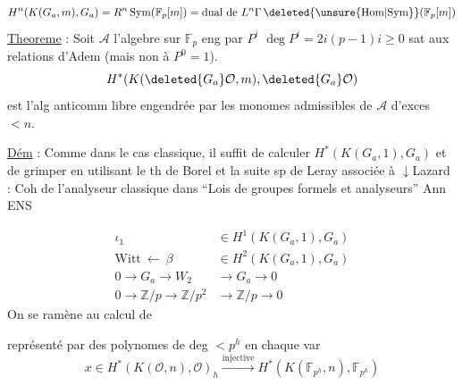 \[
H^n(K(G_a,m),G_a)=R^n\operatorname{Sym}(\mathbb F_p[m])
=\text{dual de }L^n\Gamma\,\deleted{\unsure{\mathrm{Hom}|\mathrm{Sym}}}(\mathbb F_p[m])
\]
\uline{Theoreme} : Soit $\mathscr A$ l'algebre sur $\mathbb F_p$ eng par $P^i$\qquad
$\deg P^i=2i(p-1)$\qquad $i\geq0$ sat aux relations d'Adem (mais non à $P^0=1$).
\[
H^*(K(\deleted{G_a}\mathcal O,m),\deleted{G_a}\mathcal O)
\]
est l'alg anticomm libre engendrée par les monomes admissibles de $\mathscr A$ d'exces $<n$.

\uline{Dém} : Comme dans le cas classique, il suffit de calculer $H^*(K(G_a,1),G_a)$ et de grimper en utilisant le th de Borel et la suite sp de Leray associée à
$\downarrow$\quad Lazard : Coh de l'analyseur classique dans ``Lois de groupes formels et analyseurs'' Ann ENS

\[
\begin{aligned}
\iota_1&\in H^1(K(G_a,1),G_a)\\
\text{Witt}\ \longleftarrow\ \beta&\in H^2(K(G_a,1),G_a)\\
0\to G_a\to W_2&\to G_a\to0\\
0\to\mathbb Z/p\to\mathbb Z/p^2&\to\mathbb Z/p\to0
\end{aligned}
\]
On se ramène au calcul de

représenté par des polynomes de deg $<p^h$ en chaque var
\[
x\in H^*(K(\mathcal O,n),\mathcal O)_h\xrightarrow{\text{injective}}H^*(K(\mathbb F_{p^h},n),\mathbb F_{p^h})
\]

